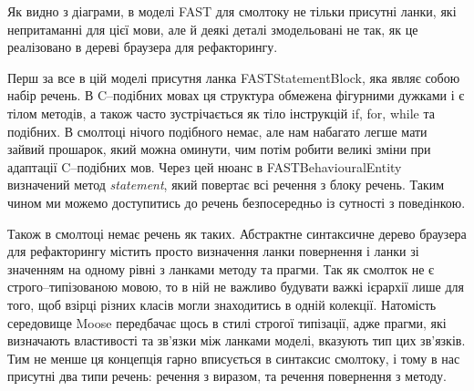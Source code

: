 \documentclass[12pt,a4paper]{article}
\begin{document}
Як видно з діаграми, в моделі FAST для смолтоку не тільки присутні ланки, які непритаманні для цієї мови, але й деякі деталі змодельовані не так, як це реалізовано в дереві браузера для рефакторингу.

Перш за все в цій моделі присутня ланка FASTStatementBlock, яка являє собою набір речень. В C--подібних мовах ця структура обмежена фігурними дужками і є тілом методів, а також часто зустрічається як тіло інструкцій if, for, while та подібних. В смолтоці нічого подібного немає, але нам набагато легше мати зайвий прошарок, який можна оминути, чим потім робити великі зміни при адаптації C--подібних мов. Через цей нюанс в FASTBehaviouralEntity визначений метод \emph{statement}, який повертає всі речення з блоку речень. Таким чином ми можемо доступитись до речень безпосередньо із сутності з поведінкою.

Також в смолтоці немає речень як таких. Абстрактне синтаксичне дерево браузера для рефакторингу містить просто визначення ланки повернення і ланки зі значенням на одному рівні з ланками методу та прагми. Так як смолток не є строго--типізованою мовою, то в ній не важливо будувати важкі ієрархії лише для того, щоб взірці різних класів могли знаходитись в одній колекції. Натомість середовище Moose передбачає щось в стилі строгої типізації, адже прагми, які визначають властивості та зв'язки між ланками моделі, вказують тип цих зв'язків. Тим не менше ця концепція гарно вписується в синтаксис смолтоку, і тому в нас присутні два типи речень: речення з виразом, та речення повернення з методу.
\end{document}
